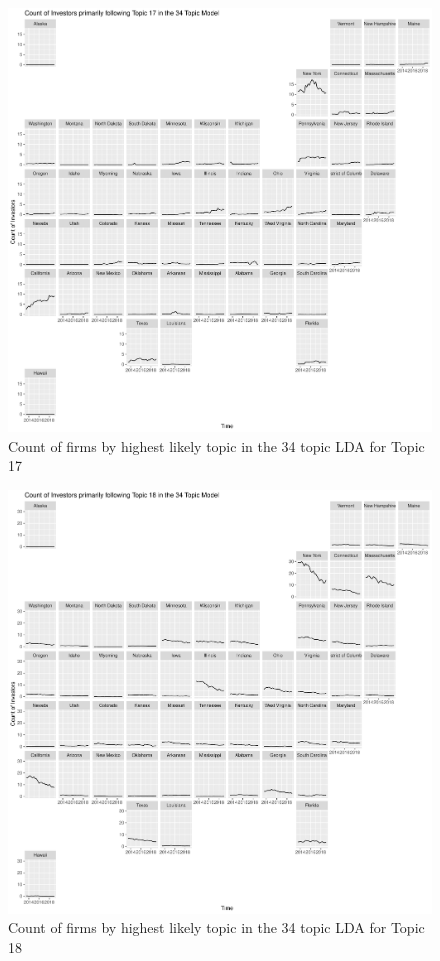 		\begin{figure}
		\centering
		\includegraphics[width=1\linewidth]{Figures/ChapterV/USA_34_Topic17.pdf}
		\caption[Count of firm for Topic 17 by quarter]{Count of firms by highest likely topic in the 34 topic LDA for Topic 17}
		\label{fig:StateLDA17}
	\end{figure}
	
		\begin{figure}
		\centering
		\includegraphics[width=1\linewidth]{Figures/ChapterV/USA_34_Topic18.pdf}
		\caption[Count of firm for Topic 18 by quarter]{Count of firms by highest likely topic in the 34 topic LDA for Topic 18}
		\label{fig:StateLDA18}
	\end{figure}
	
